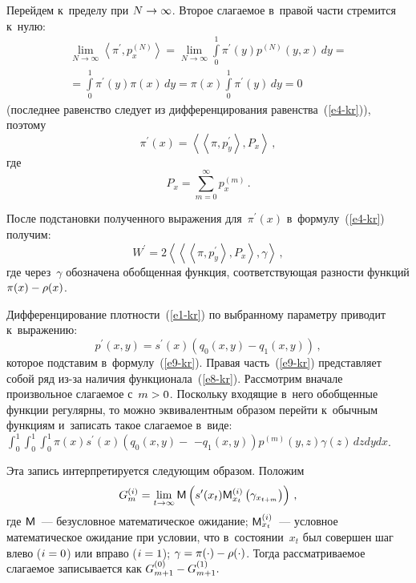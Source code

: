 \begin{multicols}{2}
  Перейдем к~пределу при $N\hm\to \infty$. Второе сла\-га\-емое в~правой час\-ти 
стремится к~нулю:
  \begin{multline*}
  \lim\limits_{N\to\infty} \left\langle \pi^\prime, p_x^{(N)}\right\rangle = 
\lim\limits_{N\to\infty} \int\limits_0^1 \pi^\prime(y) p^{(N)}(y,x)\,dy={}\\
{}=
  \int\limits_0^1 \pi^\prime(y) \pi(x)\,dy=\pi(x) \int\limits_0^1 \pi^\prime(y)\,dy=0
  \end{multline*}
(последнее равенство следует из дифференцирования равенства~(\ref{e4-kr})), поэтому
$$
\pi^\prime(x)=\left\langle \left\langle \pi, p_y^\prime\right\rangle, 
P_x\right\rangle\,,
$$
где
\begin{equation}
P_x=\sum\limits^\infty_{m=0} p_x^{(m)}\,.
\label{e8-kr}
\end{equation}
  
  После подстановки полученного выражения для~$\pi^\prime(x)$ 
в~формулу~(\ref{e4-kr}) получим:
  \begin{equation}
  W^\prime= 2\left\langle\left\langle\left\langle \pi, p_y^\prime\right\rangle, 
P_x\right\rangle, \gamma\right\rangle\,,
  \label{e9-kr}
  \end{equation}
где через~$\gamma$ обозначена обобщенная функция, со\-от\-вет\-ст\-ву\-ющая 
раз\-ности функций $\pi(x)\hm- \rho(x)$.

  Дифференцирование плот\-ности~(\ref{e1-kr}) по выбранному па\-ра\-мет\-ру 
приводит к~выражению:
  $$
  p^\prime(x,y)=s^\prime(x)\left( q_0(x,y) -q_1(x,y)\right)\,,
  $$
которое подставим в~формулу~(\ref{e9-kr}). Правая часть~(\ref{e9-kr}) 
представляет собой ряд из-за наличия функционала~(\ref{e8-kr}). Рассмотрим 
вначале произвольное сла\-га\-емое с~$m\hm> 0$. Поскольку входящие в~него 
обобщенные функции регулярны, то можно эквивалентным образом перейти 
к~обычным функциям и~записать такое слагаемое в~виде:
$\int\nolimits_0^1\!
\int\nolimits_0^1\!
 \int\nolimits_0^1
  \pi(x)s^\prime(x) 
\left( q_0(x,y)-\right.$\linebreak %
$\left.-q_1(x,y)\right) p^{(m)} (y,z) \gamma(z)\,dzdydx$.
  
  Эта запись интерпретируется следующим образом. Положим
  \begin{equation}
  G_m^{(i)} =\lim\limits_{t\to \infty} {\sf M}\left(  s^\prime(x_t) {\sf 
M}_{x_t}^{(i)}\left( \gamma_{x_{t+m}}\right)\right)\,,
  \label{e10-kr}
  \end{equation}
где ${\sf M}$~--- безусловное математическое ожидание; ${\sf 
M}_{x_t}^{(i)}$~--- условное математическое ожидание при условии, что 
в~состоянии~$x_t$ был совершен шаг влево ($i\hm=0$) или вправо 
($i\hm=1$); $\gamma\hm= \pi(\cdot)\hm- \rho(\cdot)$. Тогда рас\-смат\-ри\-ва\-емое 
слагаемое записывается как
$G_{m+1}^{(0)} \hm-G^{(1)}_{m+1}.$
  

\end{multicols}
